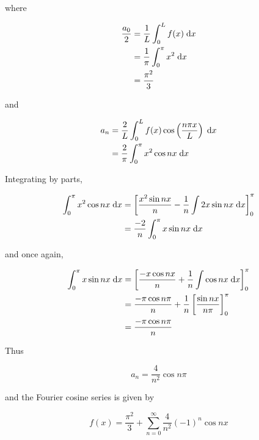 \documentclass[a4paper]{article}
\begin{document}
\begin{enumerate}[label = (\alph*)]
	where 
	
	\begin{align*}
	\frac{a_{0}}{2} & = \frac{1}{L} \int_{0}^{L} f(x) \; \mathrm{d} x \\
	& = \frac{1}{\pi} \int_{0}^{\pi} x^{2} \; \mathrm{d} x\\
	& = \frac{\pi^{2}}{3}
	\end{align*}
	
	and 
	
	\begin{align*}
	a_{n} & = \frac{2}{L} \int_{0}^{L} f(x) \cos \left( \frac{n \pi x}{L} \right) \; \mathrm{d} x  \\
	& = \frac{2}{\pi} \int_{0}^{\pi} x^{2} \cos n x \; \mathrm{d} x
	\end{align*}
	
	Integrating by parts,
	
	
	\begin{align*}
	\int_{0}^{\pi} x^{2} \cos n x \; \mathrm{d} x & = \left[ \frac{x^{2}\sin n x}{n}  - \frac{1}{n}\int 2x \sin n x \; \mathrm{d} x \right]_{0}^{\pi} \\
	& = \frac{-2}{n} \int_{0}^{\pi} x \sin n x \; \mathrm{d} x
	\end{align*}
	
	and once again,
	
	\begin{align*}
	\int_{0}^{\pi} x \sin n x \; \mathrm{d} x & = \left[  \frac{- x \cos n x}{n} + \frac{1}{n} \int \cos n x \; \mathrm{d} x \right]_{0}^{\pi} \\
	& = \frac{- \pi \cos n \pi}{n} + \frac{1}{n} \left[ \frac{\sin n x}{n \pi} \right]_{0}^{\pi} \\
	& = \frac{- \pi \cos n \pi}{n}
	\end{align*}
	
	Thus
	
	\[ a_{n} = \frac{4}{n^{2}} \cos n \pi  \]
	
	and the Fourier cosine series is given by
	
	\[ f(x) = \frac{\pi^{2}}{3} + \sum_{n=0}^{\infty} \frac{4}{n^{2}} (-1)^{n} \cos n x \]
	
\end{enumerate}
\end{document}
